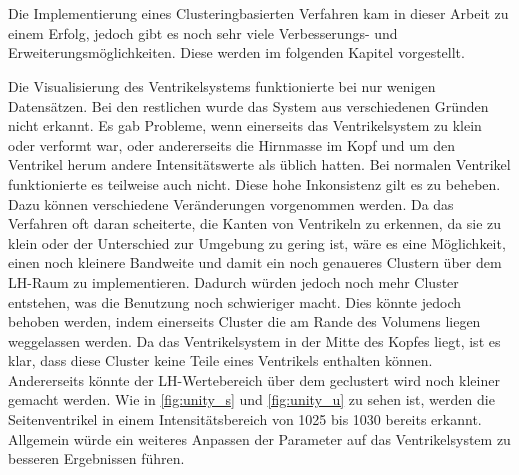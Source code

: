 \chapter{}
\label{sec:conclusion}



Die Implementierung eines Clusteringbasierten Verfahren kam in dieser Arbeit zu einem Erfolg, jedoch gibt es noch sehr viele Verbesserungs- und Erweiterungsmöglichkeiten. Diese werden im folgenden Kapitel vorgestellt.


Die Visualisierung des Ventrikelsystems funktionierte bei nur wenigen Datensätzen. Bei den restlichen wurde das System aus verschiedenen Gründen nicht erkannt.
\newline
Es gab Probleme, wenn einerseits das Ventrikelsystem zu klein oder verformt war, oder andererseits die Hirnmasse im Kopf und um den Ventrikel herum andere Intensitätswerte als üblich hatten.
\newline
Bei normalen Ventrikel funktionierte es teilweise auch nicht. Diese hohe Inkonsistenz gilt es zu beheben. Dazu können verschiedene Veränderungen vorgenommen werden.
\newline
Da das Verfahren oft daran scheiterte, die Kanten von Ventrikeln zu erkennen, da sie zu klein oder der Unterschied zur Umgebung zu gering ist, wäre es eine Möglichkeit, einen noch kleinere Bandweite und damit ein noch genaueres Clustern über dem LH-Raum zu implementieren.
\newline
Dadurch würden jedoch noch mehr Cluster entstehen, was die Benutzung noch schwieriger macht.
\newline
Dies könnte jedoch behoben werden, indem einerseits Cluster die am Rande des Volumens liegen weggelassen werden. Da das Ventrikelsystem in der Mitte des Kopfes liegt, ist es klar, dass diese Cluster keine Teile eines Ventrikels enthalten können.
\newline
Andererseits könnte der LH-Wertebereich über dem geclustert wird noch kleiner gemacht werden. Wie in \autoref{fig:unity_s} und \autoref{fig:unity_u} zu sehen ist, werden die Seitenventrikel in einem Intensitätsbereich von 1025 bis 1030 bereits erkannt.
\newline
Allgemein würde ein weiteres Anpassen der Parameter auf das Ventrikelsystem zu besseren Ergebnissen führen.


